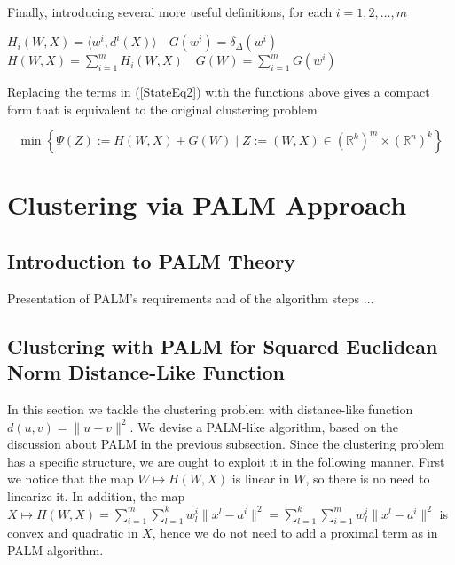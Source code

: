 \documentclass[11pt]{article}
\numberwithin{equation}{section}
\begin{document}
Finally, introducing several more useful definitions, for each $i=1, 2, \ldots , m$

\begin{center}
$H_i(W,X) = \langle w^i , d^i(X) \rangle \quad G(w^i) = \delta_{\Delta}(w^i)$
\\ \smallskip
$H(W,X) = \sum\limits_{i=1}^{m} H_i(W,X)\quad G(W) = \sum\limits_{i=1}^{m} G(w^i)$
\\
\end{center}

Replacing the terms in (\ref{StateEq2}) with the functions above gives a compact form that is equivalent to the original clustering problem

\begin{equation}
	\min \left\lbrace \Psi(Z) := H(W,X) + G(W) \mid Z := (W,X) \in (\mathbb{R}^k)^m \times (\mathbb{R}^n)^k \right\rbrace \label{StateEq4}
\end{equation}


\section{Clustering via PALM Approach}

\subsection{Introduction to PALM Theory}

Presentation of PALM's requirements and of the algorithm steps  $\ldots$


\subsection{Clustering with PALM for Squared Euclidean Norm Distance-Like Function}

In this section we tackle the clustering problem with distance-like function $d(u,v) = \|u-v\|^2$. We devise a PALM-like algorithm, based on the discussion about PALM in the previous subsection.
Since the clustering problem has a specific structure, we are ought to exploit it in the following manner.
First we notice that the map 
$W \mapsto H(W,X)$ is linear in $W$, so there is no need to linearize it. In addition, the map 
$X \mapsto H(W,X) = 
\sum\limits_{i=1}^{m} \sum\limits_{l=1}^{k} w^i_l \|x^l - a^i\|^2 =
\sum\limits_{l=1}^{k} \sum\limits_{i=1}^{m} w^i_l \|x^l - a^i\|^2$ is convex and quadratic in $X$, hence we do not need to add a proximal term as in PALM algorithm.
\end{document}
